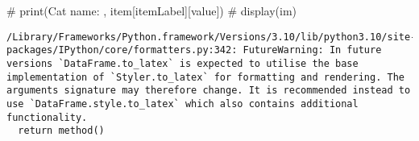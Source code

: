 \documentclass[
  letterpaper,
  DIV=11,
  numbers=noendperiod]{scrreprt}
\newenvironment{Shaded}{\begin{snugshade}}{\end{snugshade}}
\newcommand{\CommentTok}[1]{\textcolor[rgb]{0.37,0.37,0.37}{#1}}
\begin{document}
\begin{Shaded}
\begin{Highlighting}[]
    \CommentTok{\# print(\textquotesingle{}Cat name: \textquotesingle{}, item[\textquotesingle{}itemLabel\textquotesingle{}][\textquotesingle{}value\textquotesingle{}])}
    \CommentTok{\# display(im)}
\end{Highlighting}
\end{Shaded}

\begin{verbatim}
/Library/Frameworks/Python.framework/Versions/3.10/lib/python3.10/site-packages/IPython/core/formatters.py:342: FutureWarning: In future versions `DataFrame.to_latex` is expected to utilise the base implementation of `Styler.to_latex` for formatting and rendering. The arguments signature may therefore change. It is recommended instead to use `DataFrame.style.to_latex` which also contains additional functionality.
  return method()
\end{verbatim}
\end{document}

